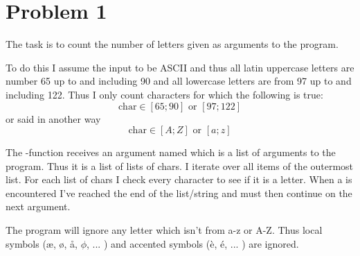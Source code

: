 \section*{Problem 1}

The task is to count the number of letters given as arguments to the program.

To do this I assume the input to be ASCII and thus all latin uppercase letters
are number 65 up to and including 90 and all lowercase letters are from 97 up
to and including 122. Thus I only count characters for which the following is
true:
$$ \text{char} \in [65;90] \text{ or } [97;122] $$
or said in another way
$$ \text{char} \in [A;Z] \text{ or } [a;z] $$

The -function receives an argument named  which is a
list of arguments to the program. Thus it is a list of lists of chars. I
iterate over all items of the outermost list. For each list of chars I check
every character to see if it is a letter. When a  is encountered
I've reached the end of the list/string and must then continue on the next
argument.

The program will ignore any letter which isn't from a-z or A-Z. Thus local
symbols (æ, ø, å, $\phi$, ... ) and accented symbols (è, é, ... ) are ignored.
